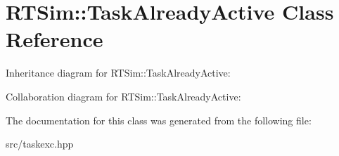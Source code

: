 \hypertarget{classRTSim_1_1TaskAlreadyActive}{}\section{R\+T\+Sim\+:\+:Task\+Already\+Active Class Reference}
\label{classRTSim_1_1TaskAlreadyActive}


Inheritance diagram for R\+T\+Sim\+:\+:Task\+Already\+Active\+:


Collaboration diagram for R\+T\+Sim\+:\+:Task\+Already\+Active\+:


The documentation for this class was generated from the following file\+:\begin{DoxyCompactItemize}
\item 
src/taskexc.\+hpp\end{DoxyCompactItemize}
